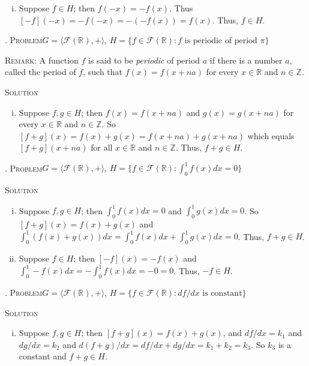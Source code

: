 \documentclass[twoside]{amsart}
\newcommand{\solution}{\textsc{Solution}\xspace}
\newcommand{\problem}{\textsc{Problem}\xspace}
\begin{document}
\begin{enumerate}[A.]
\begin{enumerate}[(i)]
      \item Suppose $f \in H$; then $f(-x)= -f(x)$. Thus 
      $[-f](-x) = -f(-x) = -(-f(x)) = f(x)$. Thus, $f\in H$.
   \end{enumerate}

   . \problem  $G=\langle \mathcal{F}(\mathbb{R}),+\rangle,\, H=
   \{ f \in \mathcal{F}(\mathbb{R}) : f \text{ is periodic of period $\pi$}\}$

   \noindent \textsc{Remark:} A function $f$ is said to be \emph{periodic}
   of period $a$ if there is a number $a$, called the period of $f$,
   such that $f(x) = f(x+na)$ for every $x \in \mathbb{R}$ and 
   $n \in \mathbb{Z}$.

   \noindent \solution 
   
   \begin{enumerate}[(i)]
      \item  Suppose $f,g \in H$; then $f(x) = f(x+na)$ and 
      $g(x) = g(x+na)$ for every $x \in \mathbb{R}$ and $n \in \mathbb{Z}$.
      So $[f+g](x) = f(x) + g(x) = f(x + na) + g(x+na)$ which equals
      $[f+g](x + na)$ for all $x\in \mathbb{R}$ and $n \in \mathbb{Z}$. 
      Thus, $f+g \in H$.
   \end{enumerate}

   . \problem $G = \langle \mathcal{F}(\mathbb{R}),+\rangle,\, H=
   \{ f \in \mathcal{F}(\mathbb{R}) : \int_0^1 f(x) dx = 0\}$

   \noindent \solution 
   \begin{enumerate}[(i)]
      \item Suppose $f,g \in H$; then $\int_0^1 f(x) dx = 0$ and
      $\int_0^1 g(x)dx = 0$. So $[f+g](x) = f(x) + g(x)$ and
      $\int_0^1 (f(x)+g(x)) dx = \int_0^1 f(x)dx + \int_0^1 g(x)dx = 0$.
      Thus, $f+g \in H$.

      \item Suppose $f \in H$; then $[-f](x) = -f(x)$ and
      $\int_0^1 -f(x)dx = -\int_0^1 f(x) dx = -0 = 0$. Thus, $-f \in H$.
   \end{enumerate}

   . \problem $G = \langle \mathcal{F}(\mathbb{R}),+\rangle,\, H =
   \{ f \in \mathcal{F}(\mathbb{R}) : df/dx \text{ is constant}\}$

   \noindent \solution 
   \begin{enumerate}[(i)]
      \item Suppose $f,g \in H$; then $[f+g](x) = f(x) + g(x)$, and
      $df/dx = k_1$ and $dg/dx = k_2$ and 
      $d(f+g)/dx = df/dx + dg/dx = k_1 + k_2 = k_3$. So $k_3$ is a constant
      and $f+g\in H$.


\end{enumerate}
\end{enumerate}
\end{document}
